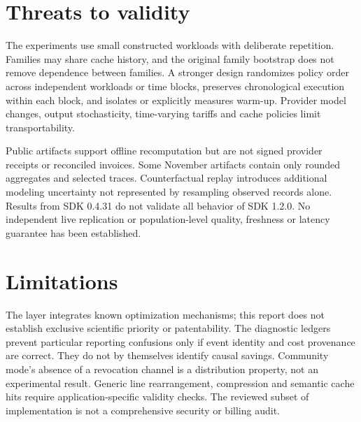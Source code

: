 \documentclass[11pt,a4paper]{article}
\begin{document}
\section{Threats to validity}\label{sec:threats}
The experiments use small constructed workloads with deliberate repetition. Families may share
cache history, and the original family bootstrap does not remove dependence between families. A
stronger design randomizes policy order across independent workloads or time blocks, preserves
chronological execution within each block, and isolates or explicitly measures warm-up. Provider
model changes, output stochasticity, time-varying tariffs and cache policies limit
transportability.

Public artifacts support offline recomputation but are not signed provider receipts or reconciled
invoices. Some November artifacts contain only rounded aggregates and selected traces.
Counterfactual replay introduces additional modeling uncertainty not represented by resampling
observed records alone. Results from SDK 0.4.31 do not validate all behavior of SDK 1.2.0. No
independent live replication or population-level quality, freshness or latency guarantee has been
established.

\section{Limitations}\label{sec:limits}
The layer integrates known optimization mechanisms; this report does not establish exclusive
scientific priority or patentability. The diagnostic ledgers prevent particular reporting
confusions only if event identity and cost provenance are correct. They do not by themselves
identify causal savings. Community mode's absence of a revocation channel is a distribution
property, not an experimental result. Generic line rearrangement, compression and semantic cache
hits require application-specific validity checks. The reviewed subset of implementation is not a
comprehensive security or billing audit.
\end{document}
